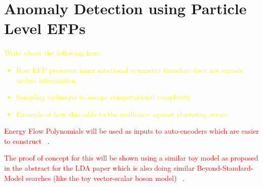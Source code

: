 \section{Anomaly Detection using Particle Level EFPs}
\label{sec:anomaly}

\textcolor{yellow}{
    Write about the following here:
    \begin{itemize}
        \item How EFP preserves inner rotational symmetry therefore does not encode useless information.
        \item Sampling technique to escape computational complexity
        \item Example of how this adds to the resilliance against clustering errors.
    \end{itemize}
}

\textcolor{red}{Energy Flow Polynomials will be used as inputs to auto-encoders which are easier to construct} ~\cite{tuhin_autoencoder}.

\textcolor{red}{The proof of concept for this will be shown using a similar toy model as proposed in the abstract for the LDA paper which is also doing similar Beyond-Standard-Model searches (like the toy vector-scalar boson model)} ~\cite{lda_jets}.
